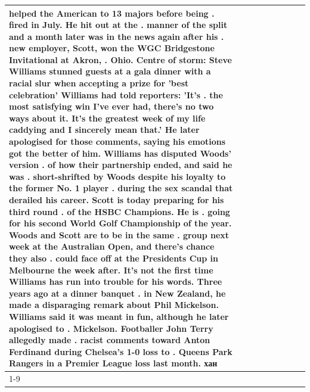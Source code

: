 \begin{table}[H]
\begin{tabular}{lllrlllll}
helped the American to 13 majors before being . fired in July. He hit out at the . manner of the split and a month later was in the news again after his . new employer, Scott, won the WGC Bridgestone Invitational at Akron, . Ohio. Centre of storm: Steve Williams stunned guests at a gala dinner with a racial slur when accepting a prize for 'best celebration' Williams had told reporters: 'It's . the most satisfying win I've ever had, there's no two ways about it. It's the greatest week of my life caddying and I sincerely mean that.' He later apologised for those comments, saying his emotions got the better of him. Williams has disputed Woods' version . of how their partnership ended, and said he was . short-shrifted by Woods despite his loyalty to the former No. 1 player . during the sex scandal that derailed his career. Scott is today preparing for his third round . of the HSBC Champions. He is . going for his second World Golf Championship of the year. Woods and Scott are to be in the same . group next week at the Australian Open, and there's chance they also . could face off at the Presidents Cup in Melbourne the week after. It's not the first time Williams has run into trouble for his words. Three years ago at a dinner banquet . in New Zealand, he made a disparaging remark about Phil Mickelson. Williams said it was meant in fun, although he later apologised to . Mickelson. Footballer John Terry allegedly made . racist comments toward Anton Ferdinand during Chelsea's 1-0 loss to . Queens Park Rangers in a Premier League loss last month. хан \\
\cline{1-9}

\end{tabular}
\end{table}
